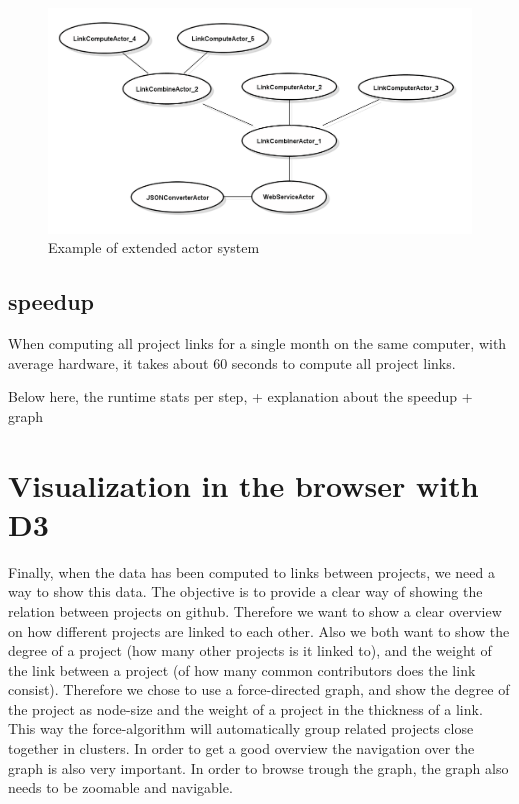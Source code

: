 \documentclass[10pt,a4paper]{article}
\begin{document}
\begin{figure}[htb]
    \centering
    \includegraphics[width=1.00\textwidth]{ActorSystemSampleExtended}
    \caption{Example of extended actor system}
    \label{fig:example_scalable}
\end{figure}

\subsection{speedup}

When computing all project links for a single month on the same computer, with average hardware, it takes about 60 seconds to compute all project links. 

Below here, the runtime stats per step, + explanation about the speedup + graph


\section{Visualization in the browser with D3}\label{sec:visualization}

Finally, when the data has been computed to links between projects, we need a way to show this data. The objective is to provide a clear way of showing the relation between projects on github. Therefore we want to show a clear overview on how different projects are linked to each other. Also we both want to show the degree of a project (how many other projects is it linked to), and the weight of the link between a project (of how many common contributors does the link consist). Therefore we chose to use a force-directed graph, and show the degree of the project as node-size and the weight of a project in the thickness of a link. This way the force-algorithm will automatically group related projects close together in clusters. In order to get a good overview the navigation over the graph is also very important. In order to browse trough the graph, the graph also needs to be zoomable and navigable.
\end{document}
